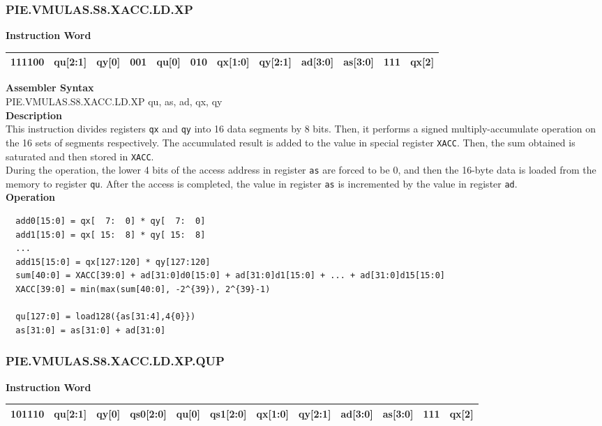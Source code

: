 \newpage
\subsubsection{PIE.VMULAS.S8.XACC.LD.XP}\label{instruction:PIEVMULASS8XACCLDXP}
\setlength\tabcolsep{6pt}
\textbf{Instruction Word} \\
\begin{tabular}{|c|c|c|c|c|c|c|c|c|c|c|c|}
	\hline
	111100 & qu[2:1] & qy[0] & 001 & qu[0] & 010 & qx[1:0] & qy[2:1] & ad[3:0] & as[3:0] & 111 & qx[2] \\
	\hline
\end{tabular}

\textbf{Assembler Syntax} \\
PIE.VMULAS.S8.XACC.LD.XP qu, as, ad, qx, qy \\
\textbf{Description} \\
This instruction divides registers \lstinline{qx} and \lstinline{qy} into 16 data segments by 8 bits. Then, it performs a signed multiply-accumulate operation on the 16 sets of segments respectively. The accumulated result is added to the value in special register \lstinline{XACC}. Then, the sum obtained is saturated and then stored in \lstinline{XACC}.\\
During the operation, the lower 4 bits of the access address in register \lstinline{as} are forced to be 0, and then the 16-byte data is loaded from the memory to register \lstinline{qu}. After the access is completed, the value in register \lstinline{as} is incremented by the value in register \lstinline{ad}.\\
\textbf{Operation}
\begin{lstlisting}
  add0[15:0] = qx[  7:  0] * qy[  7:  0]
  add1[15:0] = qx[ 15:  8] * qy[ 15:  8]
  ...
  add15[15:0] = qx[127:120] * qy[127:120]
  sum[40:0] = XACC[39:0] + ad[31:0]d0[15:0] + ad[31:0]d1[15:0] + ... + ad[31:0]d15[15:0]
  XACC[39:0] = min(max(sum[40:0], -2^{39}), 2^{39}-1)

  qu[127:0] = load128({as[31:4],4{0}})
  as[31:0] = as[31:0] + ad[31:0]
\end{lstlisting}

\newpage
\subsubsection{PIE.VMULAS.S8.XACC.LD.XP.QUP}\label{instruction:PIEVMULASS8XACCLDXPQUP}
\setlength\tabcolsep{6pt}
\textbf{Instruction Word} \\
\begin{tabular}{|c|c|c|c|c|c|c|c|c|c|c|c|}
	\hline
	101110 & qu[2:1] & qy[0] & qs0[2:0] & qu[0] & qs1[2:0] & qx[1:0] & qy[2:1] & ad[3:0] & as[3:0] & 111 & qx[2] \\
	\hline
\end{tabular}

